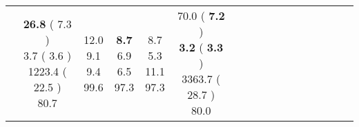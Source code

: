 \documentclass[9pt]{article}
\begin{document}
\begin{landscape}
\begin{longtable}{ l | c c c c | c c c c | c c c c | c c c c |}
 &
                    
                            \makecell{              \textbf{ 26.8 }
     (             7.3
    ) \\
            {\footnotesize             3.7
     (              3.6
     )} \\
            {\footnotesize             1223.4
     (            22.5
    ) } \\
            {\small  \textcolor[rgb]{ 0.586 , 0.314 , 0.1} {80.7  }
} }


             &
                            \makecell{              12.0
     \\
            {\footnotesize             9.1
    } \\  {\footnotesize             9.4
     } \\
            {\small \textcolor[rgb]{ 0.208 , 0.692 , 0.1} {99.6  }
} }
             &                         \makecell{              \textbf{ 8.7 }
     \\
            {\footnotesize             6.9
    } \\  {\footnotesize             6.5
     } \\
            {\small \textcolor[rgb]{ 0.254 , 0.645 , 0.1} {97.3  }
} }
             &
                            \makecell{              8.7
     \\
            {\footnotesize             5.3
    } \\  {\footnotesize             11.1
     } \\
            {\small \textcolor[rgb]{ 0.254 , 0.645 , 0.1} {97.3  }
} }
            

 & 
                            \makecell{              70.0
     (             \textbf{ 7.2 }
    ) \\
            {\footnotesize             \textbf{ 3.2 }
     (              \textbf{ 3.3 }
     )} \\
            {\footnotesize             3363.7
     (            28.7
    ) } \\
            {\small  \textcolor[rgb]{ 0.6 , 0.301 , 0.1} {80.0  }
} }



\end{longtable}
\end{landscape}
\end{document}
